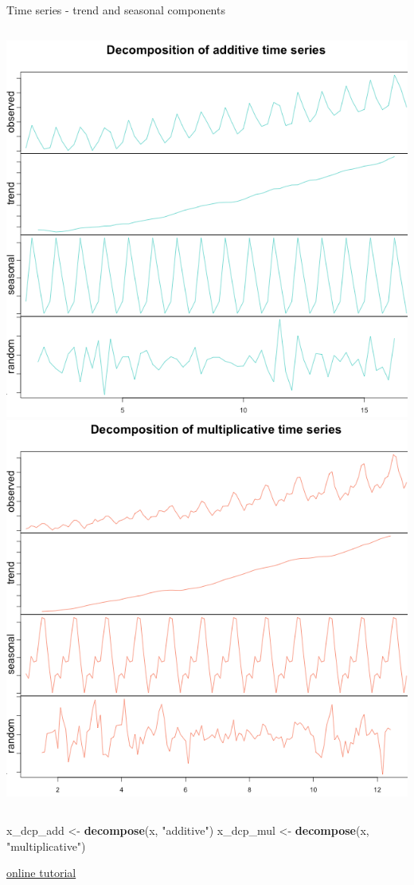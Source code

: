 \documentclass[8pt,ignorenonframetext,]{beamer}
\newenvironment{Shaded}{\begin{snugshade}}{\end{snugshade}}
\newcommand{\KeywordTok}[1]{\textcolor[rgb]{0.13,0.29,0.53}{\textbf{{#1}}}}
\newcommand{\StringTok}[1]{\textcolor[rgb]{0.31,0.60,0.02}{{#1}}}
\newcommand{\NormalTok}[1]{{#1}}
\newcommand{\columnsbegin}{\begin{columns}}
\newcommand{\columnsend}{\end{columns}}
\begin{document}
\begin{frame}[fragile]{Time series - trend and seasonal components}

\columnsbegin
{} \includegraphics{imgPres/additive-decompose.png}
\includegraphics{imgPres/multiplicative-decompose.png} \columnsend

\begin{Shaded}
\begin{Highlighting}[]
\NormalTok{x_dcp_add <-}\StringTok{ }\KeywordTok{decompose}\NormalTok{(x, }\StringTok{"additive"}\NormalTok{)}
\NormalTok{x_dcp_mul <-}\StringTok{ }\KeywordTok{decompose}\NormalTok{(x, }\StringTok{"multiplicative"}\NormalTok{)}
\end{Highlighting}
\end{Shaded}

\href{https://anomaly.io/seasonal-trend-decomposition-in-r/}{online
tutorial}

\end{frame}
\end{document}
